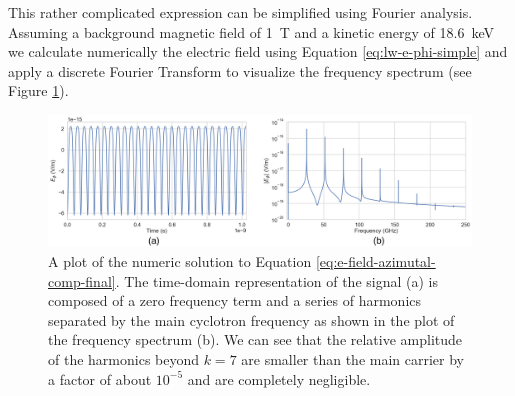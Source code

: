 This rather complicated expression can be simplified using Fourier analysis. Assuming a background magnetic field of 1~T and a kinetic energy of 18.6~keV we calculate numerically the electric field using Equation \ref{eq:lw-e-phi-simple} and apply a discrete Fourier Transform to visualize the frequency spectrum (see Figure \ref{fig:lw-azimuth-time-spectrum}).
\begin{figure}[htbp]
    \centering
    \includegraphics[width=\textwidth]{figs/Chapter-5/221122_lw_azimuthal_time_and_spectrum.png}
    \caption{A plot of the numeric solution to Equation \ref{eq:e-field-azimutal-comp-final}. The time-domain representation of the signal (a) is composed of a zero frequency term and a series of harmonics separated by the main cyclotron frequency as shown in the plot of the frequency spectrum (b). We can see that the relative amplitude of the harmonics beyond $k=7$ are smaller than the main carrier by a factor of about $10^{-5}$ and are completely negligible.}
    \label{fig:lw-azimuth-time-spectrum}
\end{figure}

